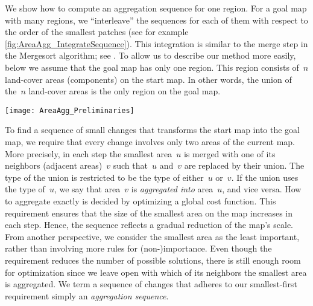 We show how to compute an aggregation sequence for one region. 
For a goal map with many regions,
we ``interleave'' the sequences for each of them
with respect to the order of the smallest patches 
(see for example \fig\ref{fig:AreaAgg_IntegrateSequence}).
This integration is similar to the merge step in the 
Mergesort algorithm; 
see \textcite[pp.~29--37]{Cormen2009}.
To allow us to describe our method more easily,
below we assume that the goal map has only one region.
This region consists of~$n$ land-cover 
areas (components) on the start map. 
In other words, the union of the~$n$ land-cover areas 
is the only region on the goal map.
\begin{figure*}[tb]
\centering
\texttt{[image: AreaAgg\_Preliminaries]}
\caption{Integrating two aggregation sequences 
	of different regions: 
	the resulting sequence contains the given sequences 
	as subsequences and 
	always takes the subdivision with smallest patch next.
	The gray arrows show the integration of the two regions.
}
\label{fig:AreaAgg_IntegrateSequence}
\end{figure*}


To find a sequence of small changes 
that transforms the start map into the goal map,
we require that 
every change involves only two areas of the current map.
More precisely, in each step the smallest area~$u$ is merged 
with one of its neighbors (adjacent areas)~$v$
such that~$u$ and~$v$ are replaced by their union.
The type of the union is restricted to be 
the type of either~$u$ or~$v$.
If the union uses the type of~$u$, 
we say that area~$v$ is \emph{aggregated into} area~$u$, 
and vice versa. 
How to aggregate exactly is decided by 
optimizing a global cost function.
This requirement ensures that the 
size of the smallest area on the map increases in each step.
Hence, the sequence reflects a gradual reduction of the 
map's scale.
From another perspective, 
we consider the smallest area as the least important, 
rather than involving more rules for (non-)importance. 
Even though the requirement reduces 
the number of possible solutions,
there is still enough room for optimization 
since we leave open with
which of its neighbors the smallest area is aggregated.
We term a sequence of changes 
that adheres to our smallest-first requirement simply 
an \emph{aggregation sequence}.


